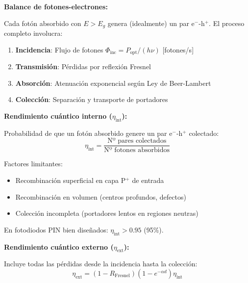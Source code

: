 \documentclass[11pt,a4paper]{article}
\begin{document}
\textbf{Balance de fotones-electrones:}

Cada fotón absorbido con $E > E_g$ genera (idealmente) un par e$^-$-h$^+$. El proceso completo involucra:

\begin{enumerate}
    \item \textbf{Incidencia}: Flujo de fotones $\Phi_{\text{inc}} = P_{\text{opt}}/(h\nu)$ [fotones/s]
    \item \textbf{Transmisión}: Pérdidas por reflexión Fresnel
    \item \textbf{Absorción}: Atenuación exponencial según Ley de Beer-Lambert
    \item \textbf{Colección}: Separación y transporte de portadores
\end{enumerate}

\textbf{Rendimiento cuántico interno ($\eta_{\text{int}}$):}

Probabilidad de que un fotón absorbido genere un par e$^-$-h$^+$ colectado:
\begin{equation}
    \eta_{\text{int}} = \frac{\text{Nº pares colectados}}{\text{Nº fotones absorbidos}}
\end{equation}

Factores limitantes:
\begin{itemize}
    \item Recombinación superficial en capa P$^+$ de entrada
    \item Recombinación en volumen (centros profundos, defectos)
    \item Colección incompleta (portadores lentos en regiones neutras)
\end{itemize}

En fotodiodos PIN bien diseñados: $\eta_{\text{int}} > 0.95$ (95\%).

\textbf{Rendimiento cuántico externo ($\eta_{\text{ext}}$):}

Incluye todas las pérdidas desde la incidencia hasta la colección:
\begin{equation}
    \eta_{\text{ext}} = (1 - R_{\text{Fresnel}})(1 - e^{-\alpha d})\eta_{\text{int}}
\end{equation}
\end{document}
